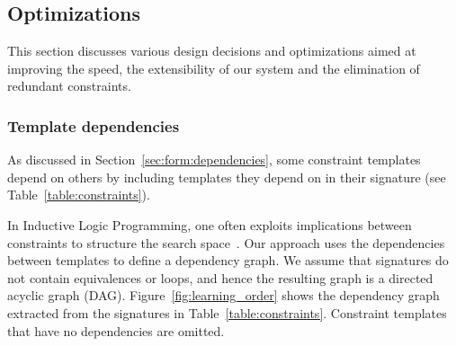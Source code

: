 \documentclass{IEEEtran}
\newcommand{\samuel}[1]{\textcolor{green}{{\sc Samuel:} #1}\xspace}
\newcommand{\tias}[1]{\textcolor{blue}{{\sc Tias:} #1}\xspace}
\theoremstyle{definition}
\begin{document}







\subsection{Optimizations} \label{sec:opts}
This section discusses various design decisions and optimizations aimed at improving the speed, the extensibility of our system and the elimination of redundant constraints.

\subsubsection{Template dependencies}
As discussed in Section~\ref{sec:form:dependencies}, some constraint templates depend on others by including templates they depend on in their signature (see Table~\ref{table:constraints}).

In Inductive Logic Programming, one often exploits implications between constraints to structure the search space~\cite{luc_book}.
Our approach uses the dependencies between templates to define a dependency graph.
We assume that signatures do not contain equivalences or loops, and hence the resulting graph is a directed acyclic graph (DAG).
Figure~\ref{fig:learning_order} shows the dependency graph extracted from the signatures in Table~\ref{table:constraints}. 
Constraint templates that have no dependencies are omitted.
\end{document}
